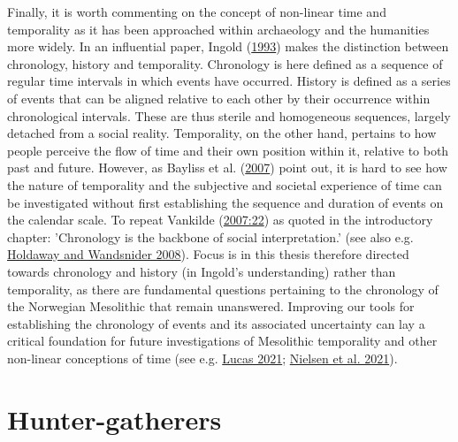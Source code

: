 \documentclass[
  12pt,
  a4paper,
  oneside]{book}
\begin{document}
Finally, it is worth commenting on the concept of non-linear time and temporality as it has been approached within archaeology and the humanities more widely. In an influential paper, Ingold (\protect\hyperlink{ref-ingold1993}{1993}) makes the distinction between chronology, history and temporality. Chronology is here defined as a sequence of regular time intervals in which events have occurred. History is defined as a series of events that can be aligned relative to each other by their occurrence within chronological intervals. These are thus sterile and homogeneous sequences, largely detached from a social reality. Temporality, on the other hand, pertains to how people perceive the flow of time and their own position within it, relative to both past and future. However, as Bayliss et al. (\protect\hyperlink{ref-bayliss2007}{2007}) point out, it is hard to see how the nature of temporality and the subjective and societal experience of time can be investigated without first establishing the sequence and duration of events on the calendar scale. To repeat Vankilde (\protect\hyperlink{ref-vankilde2007}{2007:22}) as quoted in the introductory chapter: 'Chronology is the backbone of social interpretation.' (see also e.g. \protect\hyperlink{ref-holdaway2008}{Holdaway and Wandsnider 2008}). Focus is in this thesis therefore directed towards chronology and history (in Ingold's understanding) rather than temporality, as there are fundamental questions pertaining to the chronology of the Norwegian Mesolithic that remain unanswered. Improving our tools for establishing the chronology of events and its associated uncertainty can lay a critical foundation for future investigations of Mesolithic temporality and other non-linear conceptions of time (see e.g. \protect\hyperlink{ref-lucas2021}{Lucas 2021}; \protect\hyperlink{ref-nielsen2021c}{Nielsen et al. 2021}).

\hypertarget{hunter-gatherers}{%
\section{Hunter-gatherers}\label{hunter-gatherers}}
\end{document}
